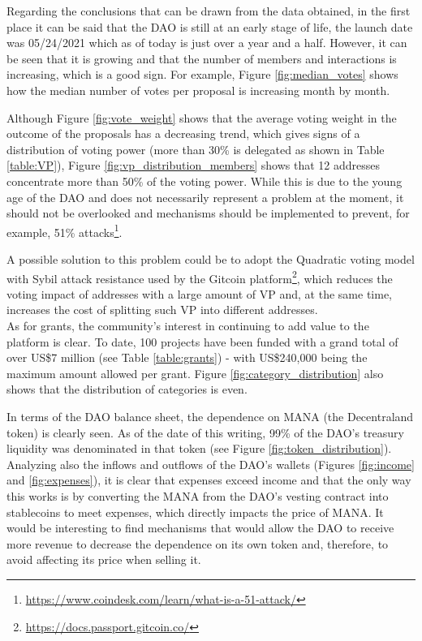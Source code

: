 \documentclass[MSE,Master,english]{twbook}%
\begin{document}
Regarding the conclusions that can be drawn from the data obtained, in the first place it can be said that the DAO is still at an early stage of life, the launch date was 05/24/2021 which as of today is just over a year and a half. However, it can be seen that it is growing and that the number of members and interactions is increasing, which is a good sign. For example, Figure \ref{fig:median_votes} shows how the median number of votes per proposal is increasing month by month.

Although Figure \ref{fig:vote_weight} shows that the average voting weight in the outcome of the proposals has a decreasing trend, which gives signs of a distribution of voting power (more than 30\% is delegated as shown in Table \ref{table:VP}), Figure \ref{fig:vp_distribution_members} shows that 12 addresses concentrate more than 50\% of the voting power. While this is due to the young age of the DAO and does not necessarily represent a problem at the moment, it should not be overlooked and mechanisms should be implemented to prevent, for example, 51\% attacks\footnote{\url{https://www.coindesk.com/learn/what-is-a-51-attack/}}. 

A possible solution to this problem could be to adopt the Quadratic voting model with Sybil attack resistance used by the Gitcoin platform\footnote{\url{https://docs.passport.gitcoin.co/}}, which reduces the voting impact of addresses with a large amount of VP and, at the same time, increases the cost of splitting such VP into different addresses. \\

As for grants, the community's interest in continuing to add value to the platform is clear.  To date, 100 projects have been funded with a grand total of over US\$7 million (see Table \ref{table:grants}) - with US\$240,000 being the maximum amount allowed per grant. Figure \ref{fig:category_distribution} also shows that the distribution of categories is even.

In terms of the DAO balance sheet, the dependence on MANA (the Decentraland token) is clearly seen. As of the date of this writing, 99\% of the DAO's treasury liquidity was denominated in that token (see Figure \ref{fig:token_distribution}). Analyzing also the inflows and outflows of the DAO's wallets (Figures \ref{fig:income} and \ref{fig:expenses}), it is clear that expenses exceed income and that the only way this works is by converting the MANA from the DAO's vesting contract into stablecoins to meet expenses, which directly impacts the price of MANA. It would be interesting to find mechanisms that would allow the DAO to receive more revenue to decrease the dependence on its own token and, therefore, to avoid affecting its price when selling it. \\
\end{document}
